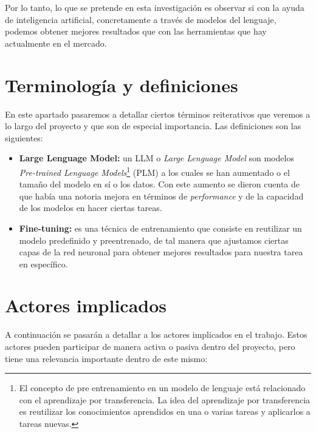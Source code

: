 Por lo tanto, lo que se pretende en esta investigación es observar si con la ayuda de inteligencia artificial, concretamente a través de modelos del lenguaje, podemos obtener mejores
resultados que con las herramientas que hay actualmente en el mercado.

\section{Terminología y definiciones}
\label{sec:terminalogia}


En este apartado pasaremos a detallar ciertos términos reiterativos que veremos a lo largo del proyecto y que son de especial importancia. Las definiciones son las siguientes:

\begin{itemize}
    \item \textbf{Large Lenguage Model:} un LLM o \textit{Large Lenguage Model} son modelos \textit{Pre-trained Lenguage Models}\footnote{El concepto de pre entrenamiento en un modelo
                                        de lenguaje está relacionado con el aprendizaje por transferencia. La idea del aprendizaje por transferencia es reutilizar los conocimientos
                                        aprendidos en una o varias tareas y aplicarlos a tareas nuevas.} (PLM) a los cuales se han aumentado o el tamaño del modelo en sí o los datos.
                                        Con este aumento se dieron cuenta de que había una notoria mejora en términos de \textit{performance} y de la capacidad de los modelos en hacer
                                        ciertas tareas. \cite{ZhaoWayneXin2023ASoL}
    \item \textbf{Fine-tuning:} es una técnica de entrenamiento que consiste en reutilizar un modelo predefinido y preentrenado, de tal manera que ajustamos ciertas capas de la
                                red neuronal para obtener mejores resultados para nuestra tarea en específico.
\end{itemize}

\section{Actores implicados}
\label{sec:actores}


A continuación se pasarán a detallar a los actores implicados en el trabajo. Estos actores pueden participar de manera activa o pasiva dentro del proyecto, pero tiene una relevancia
importante dentro de este mismo:

